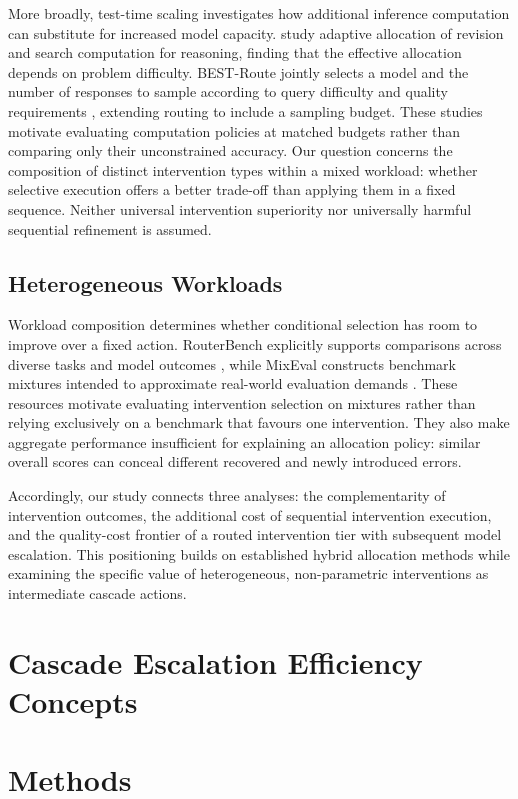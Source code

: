 \documentclass[sigconf]{acmart}
\begin{document}
More broadly, test-time scaling investigates how additional inference computation can substitute for increased model capacity. \citet{snell2025testtime} study adaptive allocation of revision and search computation for reasoning, finding that the effective allocation depends on problem difficulty. BEST-Route jointly selects a model and the number of responses to sample according to query difficulty and quality requirements \cite{ding2025bestroute}, extending routing to include a sampling budget. These studies motivate evaluating computation policies at matched budgets rather than comparing only their unconstrained accuracy. Our question concerns the composition of distinct intervention types within a mixed workload: whether selective execution offers a better trade-off than applying them in a fixed sequence. Neither universal intervention superiority nor universally harmful sequential refinement is assumed.

\subsection{Heterogeneous Workloads}

Workload composition determines whether conditional selection has room to improve over a fixed action. RouterBench explicitly supports comparisons across diverse tasks and model outcomes \cite{routerbench}, while MixEval constructs benchmark mixtures intended to approximate real-world evaluation demands \cite{mixeval}. These resources motivate evaluating intervention selection on mixtures rather than relying exclusively on a benchmark that favours one intervention. They also make aggregate performance insufficient for explaining an allocation policy: similar overall scores can conceal different recovered and newly introduced errors.

Accordingly, our study connects three analyses: the complementarity of intervention outcomes, the additional cost of sequential intervention execution, and the quality-cost frontier of a routed intervention tier with subsequent model escalation. This positioning builds on established hybrid allocation methods while examining the specific value of heterogeneous, non-parametric interventions as intermediate cascade actions.

\section{Cascade Escalation Efficiency Concepts}


\section{Methods}
\label{sec:methods}
\end{document}
